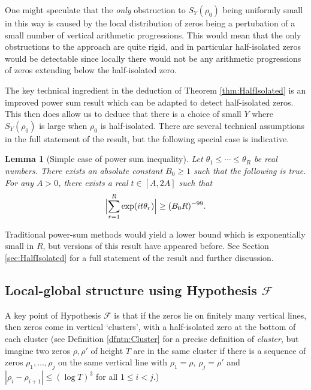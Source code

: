 \documentclass[12pt]{amsart}
\theoremstyle{plain}
\newtheorem{lemma}[theorem]{Lemma}
\theoremstyle{definition}
\theoremstyle{remark}
\begin{document}
One might speculate that the \textit{only} obstruction to $S_Y(\rho_0)$ being uniformly small in this way is caused by the local distribution of zeros being a pertubation of a small number of vertical arithmetic progressions. This would mean that the only obstructions to the approach are quite rigid, and in particular half-isolated zeros would be detectable since locally there would not be any arithmetic progressions of zeros extending below the half-isolated zero.

The key technical ingredient in the deduction of Theorem \ref{thm:HalfIsolated} is an improved power sum result which can be adapted to detect half-isolated zeros. This then does allow us to deduce that there is a choice of small $Y$ where $S_Y(\rho_0)$ is large when $\rho_0$ is half-isolated. There are several technical assumptions in the full statement of the result, but the following special case is indicative.
%
%
%
%
\begin{lemma}[Simple case of power sum inequality]
Let $\theta_1\leq \cdots \leq \theta_R$ be real numbers. There exists an absolute constant $B_0 \geq 1$ such that the following is true. For any $A >0$, there exists a real $t\in [A,2A]$ such that
\begin{align*}
\Bigl|\sum_{r=1}^R \exp(it\theta_r) \Bigr| \geq (B_0 R)^{-99}.
\end{align*}
\end{lemma}
%
%
%
%
Traditional power-sum methods would yield a lower bound which is exponentially small in $R$, but versions of this result have appeared before. See Section \ref{sec:HalfIsolated} for a full statement of the result and further discussion.
%
%
%
%
\subsection{Local-global structure using Hypothesis \texorpdfstring{$\mathcal{F}$}{F}}
%
%
%
%
A key point of Hypothesis $\mathcal{F}$ is that if the zeros lie on finitely many vertical lines, then zeros come in vertical `clusters', with a half-isolated zero at the bottom of each cluster (see Definition \ref{dfntn:Cluster} for a precise definition of \emph{cluster}, but imagine two zeros $\rho,\rho'$ of height $T$ are in the same cluster if there is a sequence of zeros $\rho_1,\dots,\rho_j$ on the same vertical line with $\rho_1=\rho$, $\rho_j=\rho'$ and $|\rho_i-\rho_{i+1}|\le (\log{T})^3$ for all $1\le i<j$.)
\end{document}
